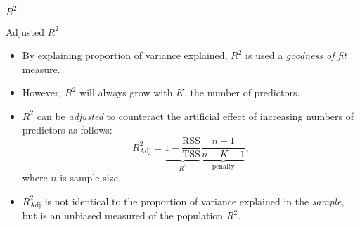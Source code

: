 \documentclass[
  10pt,
  ignorenonframetext,
]{beamer}
\newenvironment{Shaded}{\begin{snugshade}}{\end{snugshade}}
\newcommand{\AttributeTok}[1]{\textcolor[rgb]{0.77,0.63,0.00}{#1}}
\newcommand{\CommentTok}[1]{\textcolor[rgb]{0.56,0.35,0.01}{\textit{#1}}}
\newcommand{\DecValTok}[1]{\textcolor[rgb]{0.00,0.00,0.81}{#1}}
\newcommand{\FunctionTok}[1]{\textcolor[rgb]{0.00,0.00,0.00}{#1}}
\newcommand{\NormalTok}[1]{#1}
\newcommand{\OtherTok}[1]{\textcolor[rgb]{0.56,0.35,0.01}{#1}}
\newcommand{\SpecialCharTok}[1]{\textcolor[rgb]{0.00,0.00,0.00}{#1}}
\begin{document}
\begin{frame}[fragile]{\(R^2\)}
\protect\hypertarget{r2-2}{}
\begin{Shaded}
\end{Shaded}
\end{frame}

\begin{frame}{Adjusted \(R^2\)}
\protect\hypertarget{adjusted-r2}{}
\begin{itemize}
\item
  By explaining proportion of variance explained, \(R^2\) is used a
  \emph{goodness of fit} measure.
\item
  However, \(R^2\) will always grow with \(K\), the number of
  predictors.
\item
  \(R^2\) can be \emph{adjusted} to counteract the artificial effect of
  increasing numbers of predictors as follows:
  \[%
  R^2_{\text{Adj}}  = \underbrace{1-\frac{\text{RSS}}{\text{TSS}}}_{R^2}\underbrace{\frac{n-1}{n-K-1}}_{\text{penalty}},\]
  where \(n\) is sample size.
\item
  \(R^2_{\text{Adj}}\) is not identical to the proportion of variance
  explained in the \emph{sample}, but is an unbiased measured of the
  population \(R^2\).
\end{itemize}
\end{frame}
\end{document}
